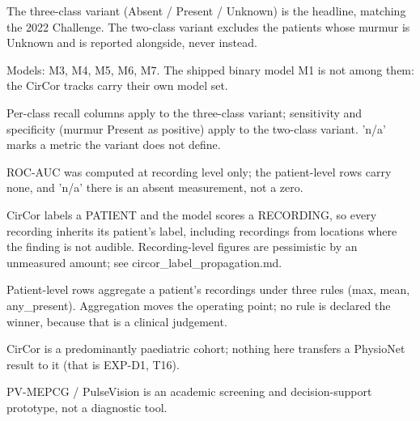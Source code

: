 \begin{table}[htbp]
\begin{tabular}{lrrrrrrrrrrrrrrr}
    \bottomrule
  \end{tabular}
  \par\footnotesize The three-class variant (Absent / Present / Unknown) is the headline, matching the 2022 Challenge. The two-class variant excludes the patients whose murmur is Unknown and is reported alongside, never instead.
  \par\footnotesize Models: M3, M4, M5, M6, M7. The shipped binary model M1 is not among them: the CirCor tracks carry their own model set.
  \par\footnotesize Per-class recall columns apply to the three-class variant; sensitivity and specificity (murmur Present as positive) apply to the two-class variant. 'n/a' marks a metric the variant does not define.
  \par\footnotesize ROC-AUC was computed at recording level only; the patient-level rows carry none, and 'n/a' there is an absent measurement, not a zero.
  \par\footnotesize CirCor labels a PATIENT and the model scores a RECORDING, so every recording inherits its patient's label, including recordings from locations where the finding is not audible. Recording-level figures are pessimistic by an unmeasured amount; see circor\_label\_propagation.md.
  \par\footnotesize Patient-level rows aggregate a patient's recordings under three rules (max, mean, any\_present). Aggregation moves the operating point; no rule is declared the winner, because that is a clinical judgement.
  \par\footnotesize CirCor is a predominantly paediatric cohort; nothing here transfers a PhysioNet result to it (that is EXP-D1, T16).
  \par\footnotesize PV-MEPCG / PulseVision is an academic screening and decision-support prototype, not a diagnostic tool.
\end{table}
